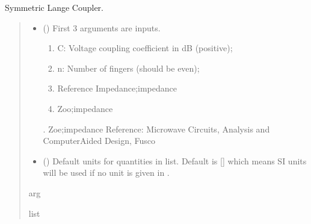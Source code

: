 \documentclass[letterpaper,10pt,english]{sphinxmanual}
\begin{document}

\begin{fulllineitems}
\label{\detokenize{components:components.SymmetricLangeCoupler}}
\pysigstartsignatures
{}
\pysigstopsignatures
\sphinxAtStartPar
Symmetric Lange Coupler.
\begin{quote}\begin{description}
\begin{itemize}
\item {} 
\sphinxAtStartPar
{} () \textendash{} 
\sphinxAtStartPar
First 3 arguments are inputs.
\begin{enumerate}
%
\item {} 
\sphinxAtStartPar
C: Voltage coupling coefficient in dB (positive);

\item {} 
\sphinxAtStartPar
n: Number of fingers (should be even);

\item {} 
\sphinxAtStartPar
Reference Impedance;impedance

\item {} 
\sphinxAtStartPar
Zoo;impedance

\end{enumerate}

. Zoe;impedance
Reference:  Microwave Circuits, Analysis and Computer\sphinxhyphen{}Aided Design, Fusco


\item {} 
\sphinxAtStartPar
{} (\sphinxstyleliteralemphasis{\sphinxupquote{, }}) \textendash{} Default units for quantities in  list. Default is {[}{]} which means SI units will be used if no unit is given in .

\end{itemize}

\sphinxAtStartPar
arg

\sphinxAtStartPar
list

\end{description}\end{quote}

\end{fulllineitems}
\end{document}
